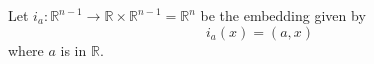 Let $i_a : \mathbb{R}^{n-1} \rightarrow \mathbb{R} \times \mathbb{R}^{n-1} = \mathbb{R}^n$ be the embedding given by
$$i_a(x) = (a, x)$$
where $a$ is in $\mathbb{R}$.

